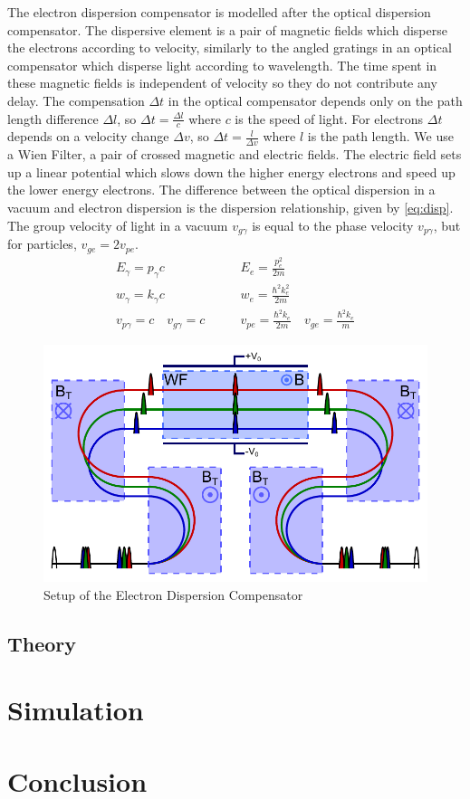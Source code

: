 \documentclass[12pt,letterpaper]{article}
\begin{document}
The electron dispersion compensator is modelled after the optical dispersion compensator.  The dispersive element is a pair of magnetic fields which disperse the electrons according to velocity, similarly to the angled gratings in an optical compensator which disperse light according to wavelength. The time spent in these magnetic fields is independent of velocity so they do not contribute any delay. The compensation $\Delta t$ in the optical compensator depends only on the path length difference $\Delta l$, so $\Delta t=\frac{\Delta l}{c}$ where $c$ is the speed of light. For electrons $\Delta t$ depends on a velocity change $\Delta v$, so $\Delta t = \frac{l}{\Delta v}$ where $l$ is the path length. We use a Wien Filter, a pair of crossed magnetic and electric fields. The electric field sets up a linear potential which slows down the higher energy electrons and speed up the lower energy electrons. 
The difference between the optical dispersion in a vacuum and electron dispersion is the dispersion relationship, given by \eqref{eq:disp}. The group velocity of light in a vacuum $v_{g \gamma}$ is equal to the phase velocity $v_{p\gamma}$, but for particles, $v_{ge}=2 v_{pe}$. 
\begin{align}
   \label{eq:disp}
E_\gamma=p_\gamma c &\qquad E_e=\frac{p_e^2}{2m}\\ 
w_\gamma =k_\gamma c &\qquad  w_e =\frac{\hbar^2 k_e^2}{2m} \\
v_{p\gamma} =c \quad v_{g\gamma}=c &\qquad  v_{pe} = \frac{\hbar^2 k_e}{2m} \quad v_{ge} = \frac{\hbar^2 k_e}{m}
\end{align}

\begin{figure}[htb]
   \centering
   \includegraphics{Setup}
   \caption{Setup of the Electron Dispersion Compensator}
   \label{fig:setup}
\end{figure}

\subsection{Theory}


\section{Simulation}

\section{Conclusion}
\end{document}
